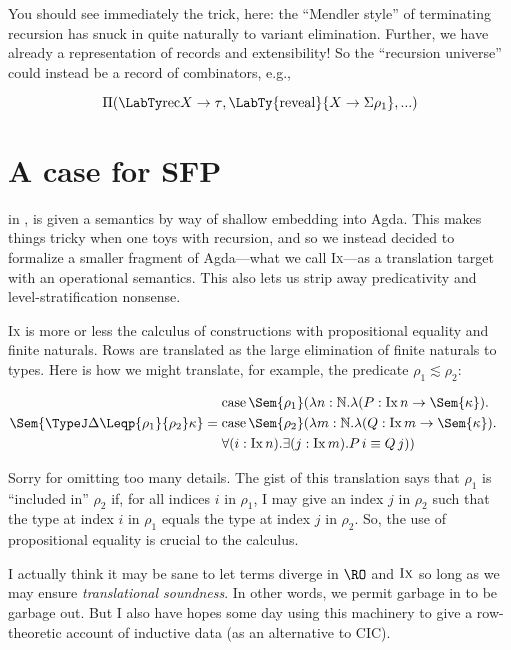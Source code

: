 \documentclass[authoryear,acmsmall,screen]{acmart}
\newcommand\IX{\textsc{Ix}}
\newcommand\Nat{\mathbb{N}}
\newcommand\Ix[1]{\mathrm{Ix} \, #1}
\newcommand\Ixed[1]{\ensuremath{\Sem{#1}}}
\renewcommand\Case{\mathrm{case}}
\begin{document}
You should see immediately the trick, here: the ``Mendler style'' of terminating recursion has snuck in quite naturally to variant elimination. Further, we have already a representation of records and extensibility! So the ``recursion universe'' could instead be a record of combinators, e.g.,

\[
\Pi (\LabTy \Rec {X \to \tau}, \LabTy {\mathrm{reveal}} {X \to \Sigma \rho_{1}}, ...)
\]

\section{A case for SFP}

in \citet{HubersM23}, \RO is given a semantics by way of shallow embedding into Agda. This makes things tricky when one toys with recursion, and so we instead decided to formalize a smaller fragment of Agda---what we call \IX---as a translation target with an operational semantics. This also lets us strip away predicativity and level-stratification nonsense.

\IX{} is more or less the calculus of constructions with propositional equality and finite naturals. Rows are translated as the large elimination of finite naturals to types. Here is how we might translate, for example, the predicate $\rho_{1} \lesssim \rho_{2}$:

\begin{align*} 
\Ixed{\TypeJ \Delta {\Leqp {\rho_{1}} {\rho_{2}}} \kappa} &=
  \begin{aligned}
              &\Case\, {\Ixed{\rho_{1}}} (\lambda n : \Nat. \lambda (P : \Ix n \to \Ixed{\kappa}).  \\
              &\Case\, {\Ixed{\rho_{2}}} (\lambda m : \Nat. \lambda (Q : \Ix m \to \Ixed{\kappa}). \\                               
              &\forall (i : \Ix n). \exists (j : \Ix m). P \, i \equiv Q \, j))
  \end{aligned}
\end{align*}

Sorry for omitting too many details. The gist of this translation says that $\rho_{1}$ is ``included in'' $\rho_{2}$ if, for all indices $i$ in $\rho_{1}$, I may give an index $j$ in $\rho_{2}$ such that the type at index $i$ in $\rho_{1}$ equals the type at index $j$ in $\rho_{2}$. So, the use of propositional equality is crucial to the calculus. 

I actually think it may be sane to let terms diverge in $\RO$ and $\IX$ so long as we may ensure \emph{translational soundness}. In other words, we permit garbage in to be garbage out. But I also have hopes some day using this machinery to give a row-theoretic account of inductive data (as an alternative to CIC).




\end{document}

